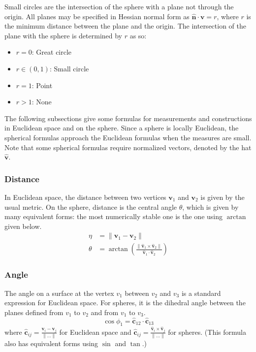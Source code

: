 \documentclass{amsart}[12pt]
\begin{document}
Small circles are the intersection of the sphere with a plane not through
the origin. All planes may be specified in Hessian normal form as
$\mathbf{\hat{n}} \cdot \mathbf v = r$, where $r$ is the minimum distance
between the plane and the origin. The intersection of the plane with the sphere
is determined by $r$ as so:

\begin{itemize}
  \item $r = 0$: Great circle
  \item $r \in (0,1)$: Small circle
  \item $r = 1$: Point
  \item $r > 1$: None
\end{itemize}

The following subsections give some formulas for measurements and constructions
in Euclidean space and on the sphere. Since a sphere is locally Euclidean, the
spherical formulas approach the Euclidean formulas when the measures are small.
Note that some spherical formulas require normalized vectors,
denoted by the hat $\mathbf{\hat{v}}$.

\subsubsection{Distance}
In Euclidean space, the distance between two vertices $\mathbf v_1$ and
$\mathbf v_2$ is given by the usual metric. On the sphere, distance is the
central angle $\theta$, which is given by many equivalent forms: the most
numerically stable one is the one using $\arctan$ given below.
\begin{equation}\begin{split}
\eta & = \|\mathbf v_1-\mathbf v_2\| \\
\theta & = \arctan\left(
  \frac{\|\mathbf{\hat{v}}_1 \times \mathbf{\hat{v}}_2\|}
  {\mathbf{\hat{v}}_1 \cdot \mathbf{\hat{v}}_2}\right)
\end{split}\end{equation}

\subsubsection{Angle}
The angle on a surface at the vertex $v_1$ between $v_2$ and $v_3$ is a
standard expression for Euclidean space. For spheres, it is the dihedral angle
between the planes defined from $v_1$ to $v_2$ and from $v_1$ to $v_3$.
\begin{equation}
  \cos\phi_1 = \mathbf{\hat{c}}_{12} \cdot \mathbf{\hat{c}}_{13}
\end{equation}
where $\mathbf{\hat{c}}_{ij} = \frac{\mathbf{v}_i - \mathbf{v}_j}{\|\dots\|}$
for Euclidean space and $\mathbf{\hat{c}}_{ij} = \frac{\mathbf{\hat{v}}_i
\times \mathbf{\hat{v}}_j}{\|\dots\|}$ for spheres. (This formula also has
equivalent forms using $\sin$ and $\tan$.)
\end{document}
